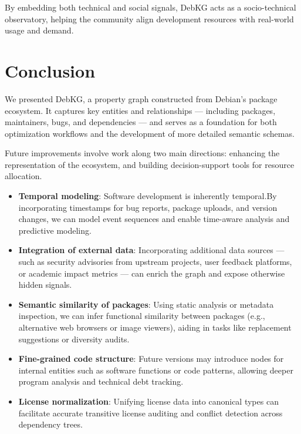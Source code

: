 \documentclass[10pt,oneside,a4paper, twocolumn]{article}
\begin{document}
    By embedding both technical and social signals, DebKG acts as a socio-technical observatory, helping the community align development resources with real-world usage and demand.


    \section{Conclusion}

    We presented DebKG, a property graph constructed from Debian’s package ecosystem.
    It captures key entities and relationships — including packages, maintainers, bugs, and dependencies — and serves as a foundation for both optimization workflows and the development of more detailed semantic schemas.

    Future improvements involve work along two main directions: enhancing the representation of the ecosystem, and building decision-support tools for resource allocation.

    \begin{itemize}
        \item \textbf{Temporal modeling}: Software development is inherently temporal.By incorporating timestamps for bug reports, package uploads, and version changes, we can model event sequences and enable time-aware analysis and predictive modeling.

        \item \textbf{Integration of external data}: Incorporating additional data sources — such as security advisories from upstream projects, user feedback platforms, or academic impact metrics — can enrich the graph and expose otherwise hidden signals.

        \item \textbf{Semantic similarity of packages}: Using static analysis or metadata inspection, we can infer functional similarity between packages (e.g., alternative web browsers or image viewers), aiding in tasks like replacement suggestions or diversity audits.

        \item \textbf{Fine-grained code structure}: Future versions may introduce nodes for internal entities such as software functions or code patterns, allowing deeper program analysis and technical debt tracking.

        \item \textbf{License normalization}: Unifying license data into canonical types can facilitate accurate transitive license auditing and conflict detection across dependency trees.
    \end{itemize}
\end{document}
